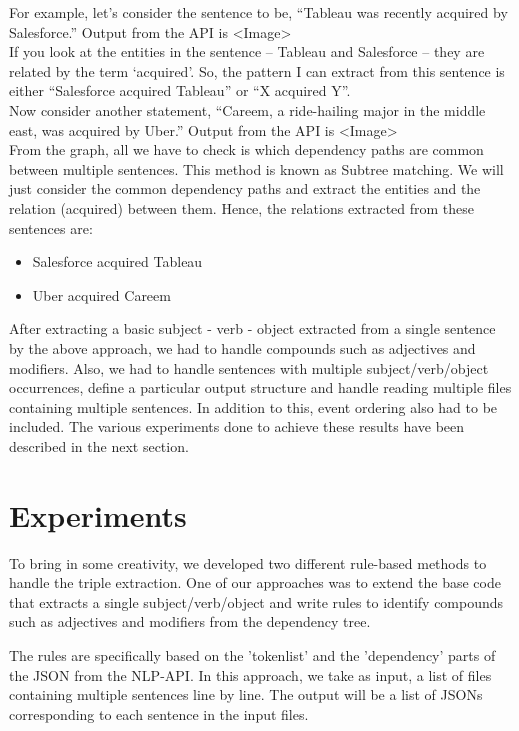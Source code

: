 \documentclass[11pt,letterpaper]{article}
\begin{document}
For example, let's consider the sentence to be, “Tableau was recently acquired by Salesforce.” Output from the API is <Image>\\

If you look at the entities in the sentence – Tableau and Salesforce – they are related by the term ‘acquired’. So, the pattern I can extract from this sentence is either “Salesforce acquired Tableau” or “X acquired Y”.\\

Now consider another statement, “Careem, a ride-hailing major in the middle east, was acquired by Uber.” Output from the API is <Image>\\

From the graph, all we have to check is which dependency paths are common between multiple sentences. This method is known as Subtree matching. We will just consider the common dependency paths and extract the entities and the relation (acquired) between them. Hence, the relations extracted from these sentences are:
\begin{itemize}
    \item Salesforce acquired Tableau
    \item Uber acquired Careem
\end{itemize}

After extracting a basic subject - verb - object extracted from a single sentence by the above approach, we had to handle compounds such as adjectives and modifiers. Also, we had to handle sentences with multiple subject/verb/object occurrences, define a particular output structure and handle reading multiple files containing multiple sentences. In addition to this, event ordering also had to be included. The various experiments done to achieve these results have been described in the next section. 

\section{Experiments}
To bring in some creativity, we developed two different rule-based methods to handle the triple extraction. One of our approaches was to extend the base code that extracts a single subject/verb/object and write rules to identify compounds such as adjectives and modifiers from the dependency tree. 

\noindent
The rules are specifically based on the 'tokenlist' and the 'dependency' parts of the JSON from the NLP-API. In this approach, we take as input, a list of files containing multiple sentences line by line. The output will be a list of JSONs corresponding to each sentence in the input files. \\
\end{document}

